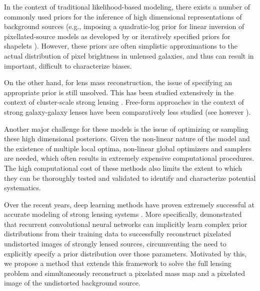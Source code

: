 In the context of traditional likelihood-based modeling, there exists a number of commonly used priors for the inference of high dimensional representations of background sources (e.g., imposing a quadratic-log prior for linear inversion of pixellated-source models as developed by \citet{Warren2003,Suyu2006} or iteratively specified priors for shapelets \citep{Birrer2015,Birrer2018,Nightingale2018}).
However, these priors are often simplistic approximations to the actual distribution of pixel brightness in unlensed galaxies, and thus can result in important, difficult to characterize biases.

On the other hand, for lens mass reconstruction, the issue of specifying an appropriate prior is still unsolved. This has been studied extensively in the context of cluster-scale strong lensing \citep{Bartelmann1996,Seitz1998,Abdelsalam1998,Abdelsalam1998b,Bradac2005,Diego2005,Cacciato2006,Diego2007,Liesenborgs2006,Liesenborgs2007,Jee2007,Coe2008,Merten2009,Deb2012,Merten2016,Ghosh2020,Torres-Ballestros2022}. Free-form approaches in the context of strong galaxy-galaxy lenses have been comparatively less studied (see however \citet{Saha1997,Saha2004,Birrer2015,Coles2014}). 


Another major challenge for these models is the issue of optimizing or sampling these high dimensional posteriors. 
Given the non-linear nature of the model and the existence of multiple local optima, non-linear global optimizers and samplers are needed, which often results in extremely expensive computational procedures.
The high computational cost of these methods also limits the extent to which they can be thoroughly tested and validated to identify and characterize potential systematics.


Over the recent years, deep learning methods have proven extremely successful at accurate modeling of strong lensing systems \citep{Hezaveh2017,PerreaultLevasseur2017,Morningstar2018,Coogan2020,Park2021,Legin2021,Legin2022,Wagner-Carena2021,Schuldt2022,Wagner-Carena2022,Karchev2022,AnauMontel2022,Mishra-Sharma2022,Schuldt2022}.
More specifically, \citet{Morningstar2019} demonstrated that recurrent convolutional neural networks can implicitly learn complex prior distributions from their training data to successfully reconstruct pixelated undistorted images of strongly lensed sources, circumventing the need to explicitly specify a prior distribution over those parameters. Motivated by this, we propose a method that extends this framework to solve the full lensing problem and simultaneously reconstruct a pixelated mass map and a pixelated image of the undistorted background source.

